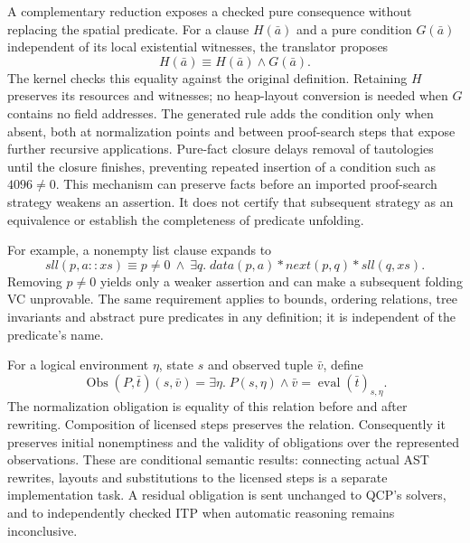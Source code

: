 A complementary reduction exposes a checked pure consequence without
replacing the spatial predicate. For a clause $H(\bar a)$ and a pure condition
$G(\bar a)$ independent of its local existential witnesses, the translator
proposes
\[
 H(\bar a) \equiv H(\bar a)\land G(\bar a).
\]
The kernel checks this equality against the original definition. Retaining
$H$ preserves its resources and witnesses; no heap-layout conversion is needed
when $G$ contains no field addresses. The generated rule adds the condition
only when absent, both at normalization points and between proof-search steps
that expose further recursive applications. Pure-fact closure delays removal of tautologies until the
closure finishes, preventing repeated insertion of a condition such as
$4096\ne0$. This mechanism can preserve facts before an imported proof-search
strategy weakens an assertion. It does not certify that subsequent strategy as
an equivalence or establish the completeness of predicate unfolding.

For example, a nonempty list clause expands to
\[
 sll(p,a::xs)\equiv
 p\ne0\ \land\ \exists q.\;
 data(p,a)*next(p,q)*sll(q,xs).
\]
Removing $p\ne0$ yields only a weaker assertion and can make a subsequent
folding VC unprovable. The same requirement applies to bounds, ordering
relations, tree invariants and abstract pure predicates in any definition;
it is independent of the predicate's name.

For a logical environment $\eta$, state $s$ and observed tuple $\bar v$, define
\[
 \operatorname{Obs}(P,\bar t)(s,\bar v)
 = \exists\eta.\;P(s,\eta)\land
             \bar v=\operatorname{eval}(\bar t)_{s,\eta}.
\]
The normalization obligation is equality of this relation before and after
rewriting. Composition of licensed steps preserves the relation. Consequently
it preserves initial nonemptiness and the validity of obligations over the
represented observations. These are conditional semantic results: connecting
actual AST rewrites, layouts and substitutions to the licensed steps is a
separate implementation task. A residual obligation is sent unchanged to QCP's
solvers, and to independently checked ITP when automatic reasoning remains
inconclusive.
